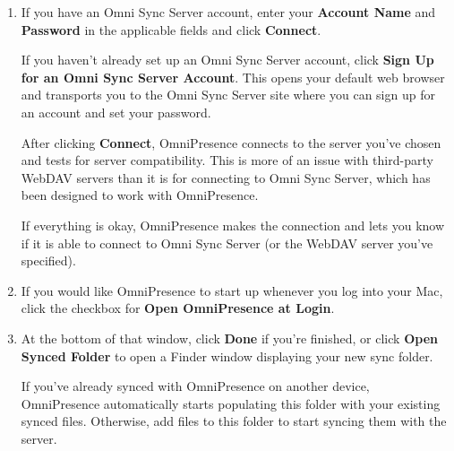 \documentclass[../main.tex]{subfiles}
\begin{document}
\begin{enumerate}
    You have two options to choose from:


    \begin{itemize}
      \item \textbf{Omni Sync Server}: This is Omni's free file server, which has specifically
        been designed to work in unison with OmniPresence.
      \item \textbf{Web Server}: This could be your own WebDAV server, or a WebDAV server hosted
        by a third-party provider.
    \end{itemize}
  \item If you have an Omni Sync Server account, enter your \textbf{Account Name} and
    \textbf{Password} in the applicable fields and click \textbf{Connect}.

    \begin{ognote}
      If you haven't already set up an Omni Sync Server account, click \textbf{Sign Up for an Omni
      Sync Server Account}. This opens your default web browser and transports you to the Omni
      Sync Server site where you can sign up for an account and set your password.
    \end{ognote}

    After clicking \textbf{Connect}, OmniPresence connects to the server you've chosen and tests
    for server compatibility. This is more of an issue with third-party WebDAV servers than it
    is for connecting to Omni Sync Server, which has been designed to work with OmniPresence.

    If everything is okay, OmniPresence makes the connection and lets you know if it is able to
    connect to Omni Sync Server (or the WebDAV server you've specified).

  \item If you would like OmniPresence to start up whenever you log into your Mac, click the
    checkbox for \textbf{Open OmniPresence at Login}.

  \item At the bottom of that window, click \textbf{Done} if you're finished, or click
    \textbf{Open Synced Folder} to open a Finder window displaying your new sync folder.

    If you've already synced with OmniPresence on another device, OmniPresence automatically
    starts populating this folder with your existing synced files. Otherwise, add files to this
    folder to start syncing them with the server.

\end{enumerate}
\end{document}
